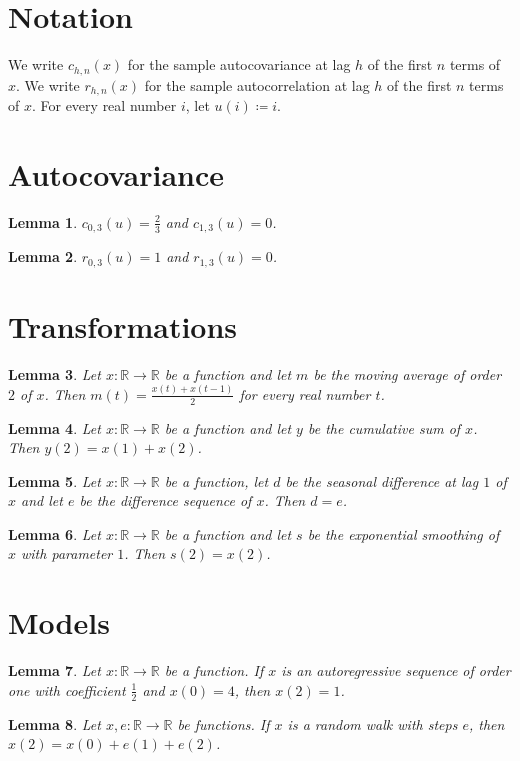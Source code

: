 \documentclass{article}
\newtheorem{lemma}{Lemma}
\begin{document}
\section{Notation}

We write $c_{h,n}(x)$ for the sample autocovariance at lag $h$ of the first $n$ terms of $x$.
We write $r_{h,n}(x)$ for the sample autocorrelation at lag $h$ of the first $n$ terms of $x$.
For every real number $i$, let $u(i)\coloneqq i$.

\section{Autocovariance}

\begin{lemma}\label{autocovariance}
$c_{0,3}(u)=\frac23$ and $c_{1,3}(u)=0$.
\end{lemma}

\begin{lemma}\label{autocorrelation}
$r_{0,3}(u)=1$ and $r_{1,3}(u)=0$.
\end{lemma}

\section{Transformations}

\begin{lemma}\label{average}
Let $x:\mathbb{R}\to\mathbb{R}$ be a function and let $m$ be the moving average of order $2$ of $x$. Then $m(t)=\frac{x(t)+x(t-1)}{2}$ for every real number $t$.
\end{lemma}

\begin{lemma}\label{cumulative}
Let $x:\mathbb{R}\to\mathbb{R}$ be a function and let $y$ be the cumulative sum of $x$. Then $y(2)=x(1)+x(2)$.
\end{lemma}

\begin{lemma}\label{seasonal}
Let $x:\mathbb{R}\to\mathbb{R}$ be a function, let $d$ be the seasonal difference at lag $1$ of $x$ and let $e$ be the difference sequence of $x$. Then $d=e$.
\end{lemma}

\begin{lemma}\label{smoothing}
Let $x:\mathbb{R}\to\mathbb{R}$ be a function and let $s$ be the exponential smoothing of $x$ with parameter $1$. Then $s(2)=x(2)$.
\end{lemma}

\section{Models}

\begin{lemma}\label{autoregressive}
Let $x:\mathbb{R}\to\mathbb{R}$ be a function. If $x$ is an autoregressive sequence of order one with coefficient $\frac12$ and $x(0)=4$, then $x(2)=1$.
\end{lemma}

\begin{lemma}\label{walk}
Let $x,e:\mathbb{R}\to\mathbb{R}$ be functions. If $x$ is a random walk with steps $e$, then $x(2)=x(0)+e(1)+e(2)$.
\end{lemma}
\end{document}
